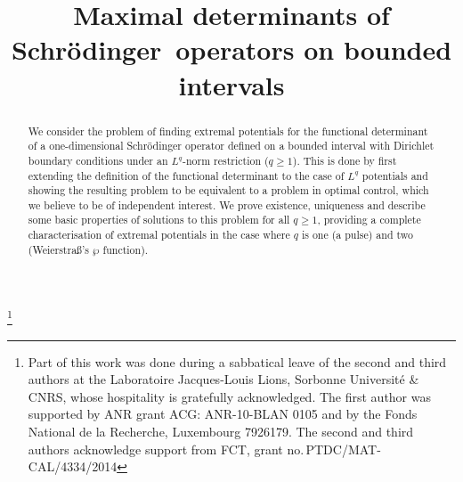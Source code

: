 \documentclass[JEP,XML,SOM,Unicode,NoEqCountersInSection,NoFloatCountersInSection]{cedram}
\theoremstyle{plain}
\theoremstyle{definition}
\begin{document}
\frontmatter

\title[Maximal determinants of Schrödinger operators]
{Maximal determinants of Schrödinger~operators on bounded intervals}

\author[\initial{C.} \middlename{L.} \lastname{Aldana}]{  }
\address{Universidad del Norte\\
Vía Puerto Colombia, Barranquilla, Colombia}

\author[\initial{J.-B.} \lastname{Caillau}]{ }
\address{Université Côte d'Azur, CNRS, Inria, LJAD, France}

\author[\initial{P.} \lastname{Freitas}]{ }
\address{Departamento de Matemática, Instituto Superior Técnico\\ Universidade de Lisboa, Av. Rovisco Pais, 1049-001 Lisboa, Portugal\\
and\\
Grupo de Física Matemática, Faculdade de Ciências, Universidade de Lisboa\\
Campo Grande, Edifício C6, 1749-016 Lisboa, Portugal}

\thanks{Part of this work was done during a sabbatical leave of the second and third authors at the Laboratoire Jacques-Louis Lions, Sorbonne Université \& CNRS, whose hospitality is gratefully acknowledged. The first author was supported by ANR grant ACG: ANR-10-BLAN 0105 and by the Fonds National de la Recherche, Luxembourg 7926179. The second and third authors acknowledge support from FCT, grant no.\,PTDC/MAT-CAL/4334/2014}

\begin{abstract}
We consider the problem of finding extremal potentials for the functional determinant of a one-dimensional Schrödinger operator defined on a bounded interval with Dirichlet boundary conditions under an $L^q$-norm restriction ($q\geq 1$). This is done by first extending the definition of the functional determinant to the case of $L^q$ potentials and showing the resulting problem to be equivalent to a problem in optimal control, which we believe to be of independent interest. We prove existence, uniqueness and describe some basic properties of solutions to this problem for all $q\geq 1$, providing a complete characterisation of extremal potentials in the case where $q$ is one (a pulse) and two (Weierstra\ss's $\wp$ function).
\end{abstract}
\end{document}

